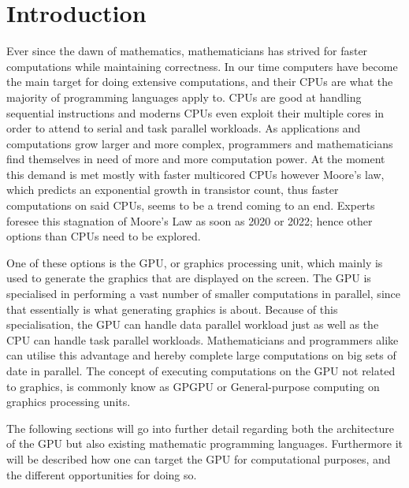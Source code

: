 \chapter{Introduction} %
\label{cha:introduction}
Ever since the dawn of mathematics, mathematicians has strived for faster computations while maintaining correctness.
In our time computers have become the main target for doing extensive computations, and their CPUs are what the majority of programming languages apply to.
CPUs are good at handling sequential instructions and moderns CPUs even exploit their multiple cores in order to attend to serial and task parallel workloads.
As applications and computations grow larger and more complex, programmers and mathematicians find themselves in need of more and more computation power.
At the moment this demand is met mostly with faster multicored CPUs however Moore's law, which predicts an exponential growth in transistor count, thus faster computations on said CPUs, seems to be a trend coming to an end.
Experts foresee this stagnation of Moore's Law as soon as 2020 or 2022; hence other options than CPUs need to be explored.\citep{Moore2013}

One of these options is the GPU, or graphics processing unit, which mainly is used to generate the graphics that are displayed on the screen.
The GPU is specialised in performing a vast number of smaller computations in parallel, since that essentially is what generating graphics is about.
Because of this specialisation, the GPU can handle data parallel workload just as well as the CPU can handle task parallel workloads.
Mathematicians and programmers alike can utilise this advantage and hereby complete large computations on big sets of date in parallel.
The concept of executing computations on the GPU not related to graphics, is commonly know as GPGPU or General-purpose computing on graphics processing units. 

The following sections will go into further detail regarding both the architecture of the GPU but also existing mathematic programming languages.
Furthermore it will be described how one can target the GPU for computational purposes, and the different opportunities for doing so. 



